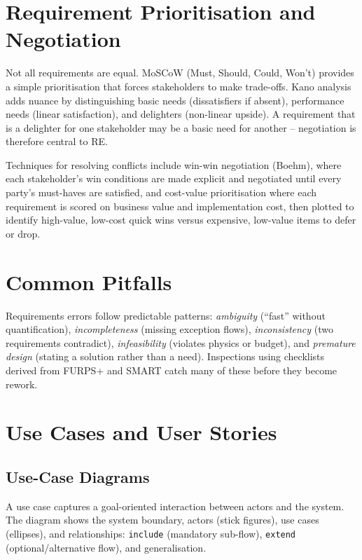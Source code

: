\section{Requirement Prioritisation and Negotiation}

Not all requirements are equal. MoSCoW (Must, Should, Could, Won't) provides a simple prioritisation that forces stakeholders to make trade-offs. Kano analysis adds nuance by distinguishing basic needs (dissatisfiers if absent), performance needs (linear satisfaction), and delighters (non-linear upside). A requirement that is a delighter for one stakeholder may be a basic need for another -- negotiation is therefore central to RE.

Techniques for resolving conflicts include win-win negotiation (Boehm), where each stakeholder's win conditions are made explicit and negotiated until every party's must-haves are satisfied, and cost-value prioritisation where each requirement is scored on business value and implementation cost, then plotted to identify high-value, low-cost quick wins versus expensive, low-value items to defer or drop.

\section{Common Pitfalls}

Requirements errors follow predictable patterns: \emph{ambiguity} (``fast'' without quantification), \emph{incompleteness} (missing exception flows), \emph{inconsistency} (two requirements contradict), \emph{infeasibility} (violates physics or budget), and \emph{premature design} (stating a solution rather than a need). Inspections using checklists derived from FURPS+ and SMART catch many of these before they become rework.

\section{Use Cases and User Stories}

\subsection{Use-Case Diagrams}

A use case captures a goal-oriented interaction between actors and the system. The diagram shows the system boundary, actors (stick figures), use cases (ellipses), and relationships: \texttt{include} (mandatory sub-flow), \texttt{extend} (optional/alternative flow), and generalisation.

